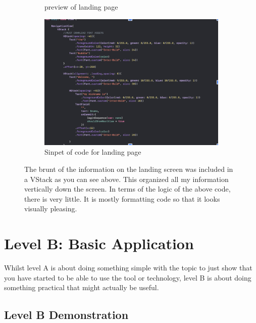 \documentclass[a4paper, 11pt]{report}
\begin{document}
\begin{figure}
\begin{subfigure}[h]{0.5\textwidth}
    \caption{preview of landing page}
    \label{fig:image1}
  \end{subfigure}
  \hfill
  \begin{subfigure}[h]{0.7\textwidth}
    \includegraphics[width=\textwidth]{2.png}
    \caption{Sinpet of code for landing page}
    \label{fig:image2}
  \end{subfigure}
  \caption{The brunt of the information on the landing screen was included in a VStack as you can see above. This organized all my information vertically down the screen. In terms of the logic of the above code, there is very little. It is mostly formatting code so that it looks visually pleasing.\\}
  \label{fig:images}
\end{figure}


\newpage
\section{Level B: Basic Application}

Whilst level A is about doing something simple with the topic to just show that you have started to be able to use the tool or technology, level B is about doing something practical that might actually be useful.

\subsection{Level B Demonstration}
\end{document}
